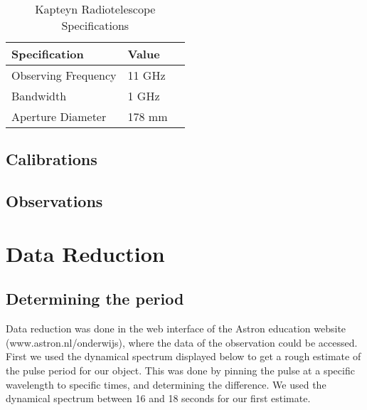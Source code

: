 \documentclass[twoside,twocolumn]{article}
\begin{document}
			
			\begin{table}[h]
				\caption{Kapteyn Radiotelescope Specifications}
				\centering
				\begin{tabular}{llr}
					\toprule
					\cmidrule(r){1-2}
					Specification & Value \\
					\midrule
					Observing Frequency & 11 GHz \\
					Bandwidth & 1 GHz \\
					Aperture Diameter & 178 mm\\
					\bottomrule
				\end{tabular}
			\end{table}
	
	\subsection{Calibrations}
	
	\subsection{Observations}
	
	
	\section{Data Reduction}
	\subsection{Determining the period}
	Data reduction was done in the web interface of the Astron education website (www.astron.nl/onderwijs), where the data of the observation could be accessed. 
	First we used the dynamical spectrum displayed below to get a rough estimate of the pulse period for our object. This was done by pinning the pulse at a specific wavelength to specific times, and determining the difference. We used the dynamical spectrum between 16 and 18 seconds for our first estimate.

	
\end{document}
